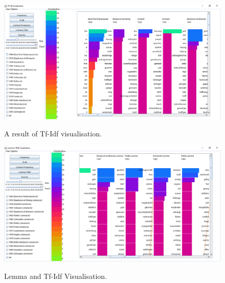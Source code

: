 \begin{figure}[H]
	\centering	
	\includegraphics[width=\textwidth]{Figs/Tf-Idf}\\[1ex]
	\caption{A result of Tf-Idf visualisation.}
	\label{fig:tfIdfView}
\end{figure} 
\begin{figure}[H]
	\centering	
	\includegraphics[width=\textwidth]{Figs/Lemma-TfIdf}\\[1ex]
	\caption{Lemma and Tf-Idf Visualisation.}
	\label{fig:tfIdfLemma}
\end{figure} 


